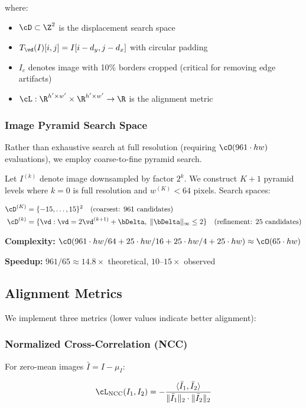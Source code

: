 {where:
\begin{itemize}
\item $\cD \subset \Z^2$ is the displacement search space
\item $T_{\vd}(I)[i,j] = I[i-d_y, j-d_x]$ with circular padding
\item $I_c$ denotes image with 10\% borders cropped (critical for removing edge artifacts)
\item $\cL: \R^{h' \times w'} \times \R^{h' \times w'} \to \R$ is the alignment metric
\end{itemize}

\subsubsection{Image Pyramid Search Space}

Rather than exhaustive search at full resolution (requiring $\cO(961 \cdot hw)$ evaluations), we employ coarse-to-fine pyramid search.

Let $I^{(k)}$ denote image downsampled by factor $2^k$. We construct $K+1$ pyramid levels where $k=0$ is full resolution and $w^{(K)} < 64$ pixels. Search spaces:

\begin{align}
\cD^{(K)} &= \{-15, \ldots, 15\}^2 \quad \text{(coarsest: 961 candidates)} \\
\cD^{(k)} &= \{\vd : \vd = 2\vd^{(k+1)} + \bDelta, \; \|\bDelta\|_\infty \leq 2\} \quad \text{(refinement: 25 candidates)}
\end{align}

\textbf{Complexity:} $\cO(961 \cdot hw/64 + 25 \cdot hw/16 + 25 \cdot hw/4 + 25 \cdot hw) \approx \cO(65 \cdot hw)$

\textbf{Speedup:} $961/65 \approx 14.8\times$ theoretical, $10$--$15\times$ observed

\subsection{Alignment Metrics}

We implement three metrics (lower values indicate better alignment):

\subsubsection{Normalized Cross-Correlation (NCC)}

For zero-mean images $\bar{I} = I - \mu_I$:

\begin{equation}
\cL_{\text{NCC}}(I_1, I_2) = -\frac{\langle \bar{I}_1, \bar{I}_2 \rangle}{\|\bar{I}_1\|_2 \cdot \|\bar{I}_2\|_2}
\end{equation}

}
